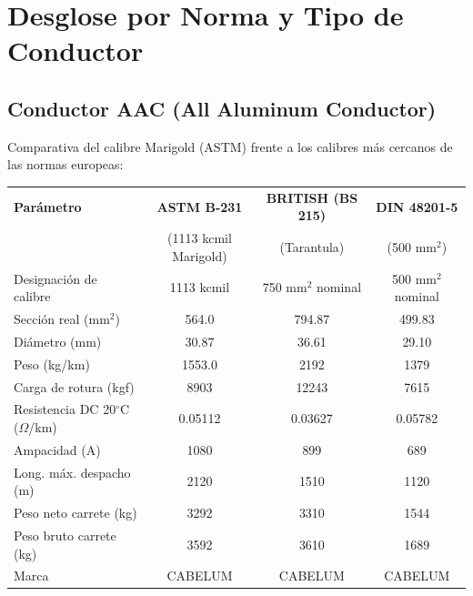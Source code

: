 \documentclass[12pt,a4paper]{article}
\begin{document}
\section{Desglose por Norma y Tipo de Conductor}

\begin{landscape}
\subsection{Conductor AAC (All Aluminum Conductor)}

Comparativa del calibre Marigold (ASTM) frente a los calibres más cercanos
de las normas europeas:

\begin{center}
\begin{tabular}{p{4cm}c|c|c}
\toprule
\textbf{Parámetro} & \textbf{ASTM B-231} & \textbf{BRITISH (BS 215)} & \textbf{DIN 48201-5} \\
& (1113 kcmil Marigold) & (Tarantula) & (500 mm$^2$) \\
\midrule
Designación de calibre & 1113 kcmil & 750 mm$^2$ nominal & 500 mm$^2$ nominal \\
\midrule
Sección real (mm$^2$) & 564.0 & 794.87 & 499.83 \\
\midrule
Diámetro (mm) & 30.87 & 36.61 & 29.10 \\
\midrule
Peso (kg/km) & 1553.0 & 2192 & 1379 \\
\midrule
Carga de rotura (kgf) & 8903 & 12243 & 7615 \\
\midrule
Resistencia DC 20$^\circ$C ($\Omega$/km) & 0.05112 & 0.03627 & 0.05782 \\
\midrule
Ampacidad (A) & 1080 & 899 & 689 \\
\midrule
Long. máx. despacho (m) & 2120 & 1510 & 1120 \\
\midrule
Peso neto carrete (kg) & 3292 & 3310 & 1544 \\
\midrule
Peso bruto carrete (kg) & 3592 & 3610 & 1689 \\
\midrule
Marca & CABELUM & CABELUM & CABELUM \\
\bottomrule
\end{tabular}
\end{center}
\end{landscape}
\end{document}
